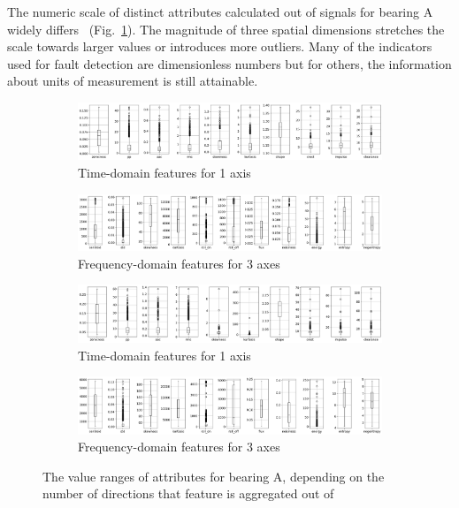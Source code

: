 The numeric scale of distinct attributes calculated out of signals for bearing A widely differs ~(Fig.~\ref{fig:design:feature-range}). The magnitude of three spatial dimensions stretches the scale towards larger values or introduces more outliers. Many of the indicators used for fault detection are dimensionless numbers but for others, the information about units of measurement is still attainable. 

\begin{figure}[h]
    \centering
    \begin{subfigure}[b]{0.48\textwidth}
        \includegraphics[width=\textwidth]{assets/results/feature-values/features-TD-dim1-A.png}
        \caption{Time-domain features for 1 axis}
    \end{subfigure}
    \hfill
    \begin{subfigure}[b]{0.48\textwidth}
        \includegraphics[width=\textwidth]{assets/results/feature-values/features-FD-dim1-A.png}
        \caption{Frequency-domain features for 3 axes}
    \end{subfigure}
    \begin{subfigure}[b]{0.48\textwidth}
        \includegraphics[width=\textwidth]{assets/results/feature-values/features-TD-dim3-A.png}
        \caption{Time-domain features for 1 axis}
    \end{subfigure}
    \hfill
    \begin{subfigure}[b]{0.48\textwidth}
        \includegraphics[width=\textwidth]{assets/results/feature-values/features-FD-dim3-A.png}
        \caption{Frequency-domain features for 3 axes}
    \end{subfigure}
    \caption{The value ranges of attributes for bearing A, depending on the number of directions that feature is aggregated out of}
    \label{fig:design:feature-range}
\end{figure}

